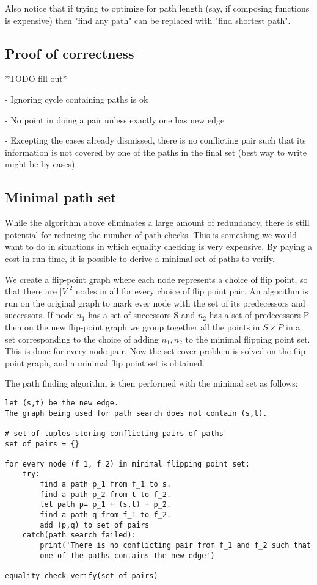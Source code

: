 \documentclass{article}
\begin{document}
Also notice that if trying to optimize for path length (say, if composing functions is expensive) then "find any path" can be replaced with "find shortest path".

\subsection{Proof of correctness}

*TODO fill out*

- Ignoring cycle containing paths is ok

- No point in doing a pair unless exactly one has new edge

- Excepting the cases already dismissed, there is no conflicting pair such that its information is not covered by one of the paths in the final set (best way to write might be by cases).

\subsection{Minimal path set}
While the algorithm above eliminates a large amount of redundancy, there is still potential for reducing the number of path checks. This is something we would want to do in situations in which equality checking is very expensive. By paying a cost in run-time, it is possible to derive a minimal set of paths to verify.

We create a flip-point graph where each node represents a choice of flip point, so that there are $|V|^2$ nodes in all for every choice of flip point pair.
An algorithm is run on the original graph to mark ever node with the set of its predecessors and successors.
If node $n_1$ has a set of successors S and $n_2$ has a set of predecessors P then on the new flip-point graph we group together all the points in $S\times P$ in a set corresponding to the choice of adding $n_1, n_2$ to the minimal flipping point set. This is done for every node pair.
Now the set cover problem is solved on the flip-point graph, and a minimal flip point set is obtained.

The path finding algorithm is then performed with the minimal set as follows:

\begin{verbatim}
let (s,t) be the new edge.
The graph being used for path search does not contain (s,t).

# set of tuples storing conflicting pairs of paths
set_of_pairs = {}

for every node (f_1, f_2) in minimal_flipping_point_set:
    try:
        find a path p_1 from f_1 to s.
        find a path p_2 from t to f_2.
        let path p= p_1 + (s,t) + p_2.
        find a path q from f_1 to f_2.
        add (p,q) to set_of_pairs    
    catch(path search failed):
        print('There is no conflicting pair from f_1 and f_2 such that
        one of the paths contains the new edge')

equality_check_verify(set_of_pairs)
            
\end{verbatim}
\end{document}
